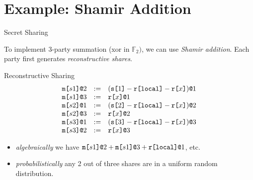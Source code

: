 \documentclass{beamer}
\begin{document}
\section{Example: Shamir Addition}
\begin{frame}{Secret Sharing}

  To implement 3-party summation (xor in $\mathbb{F}_2)$, we can use \emph{Shamir addition}.
  Each party first generates \emph{reconstructive shares}.
  
  \begin{block}{Reconstructive Sharing}
    $$
    \begin{array}{lll}
      \texttt{m[}s1\texttt{]}\texttt{@}2 &:=& (\texttt{s[}1\texttt{]} - \texttt{r[}\mathtt{local}\texttt{]} - \texttt{r[}x\texttt{]})\texttt{@}1 \\ 
      \texttt{m[}s1\texttt{]}\texttt{@}3 &:=& \texttt{r[}x\texttt{]}\texttt{@}1 \\ 
      \texttt{m[}s2\texttt{]}\texttt{@}1 &:=& (\texttt{s[}2\texttt{]} - \texttt{r[}\mathtt{local}\texttt{]} - \texttt{r[}x\texttt{]})\texttt{@}2 \\ 
      \texttt{m[}s2\texttt{]}\texttt{@}3 &:=& \texttt{r[}x\texttt{]}\texttt{@}2 \\ 
      \texttt{m[}s3\texttt{]}\texttt{@}1 &:=& (\texttt{s[}3\texttt{]} - \texttt{r[}\mathtt{local}\texttt{]} - \texttt{r[}x\texttt{]})\texttt{@}3 \\ 
      \texttt{m[}s3\texttt{]}\texttt{@}2 &:=& \texttt{r[}x\texttt{]}\texttt{@}3
    \end{array}
    $$
  \end{block}
  \begin{itemize}
  \item \emph{algebraically} we have $\texttt{m[}s1\texttt{]}\texttt{@}2 + \texttt{m[}s1\texttt{]}\texttt{@}3 + \texttt{r[}\mathtt{local}\texttt{]}\texttt{@}1$, etc.
  \item \emph{probabilistically} any 2 out of three shares are in a uniform random distribution.
  \end{itemize}
  
\end{frame}
\end{document}

